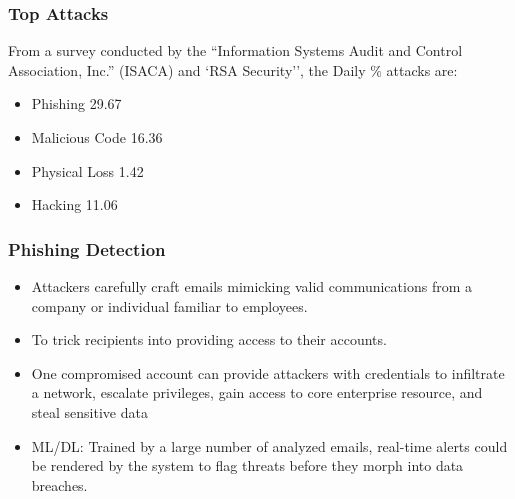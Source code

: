 \begin{frame}[fragile]\frametitle{Top Attacks}
From a survey conducted by the ``Information 
Systems Audit and Control Association, Inc.'' (ISACA) 
and `RSA Security'', the Daily \% attacks are:
	
	
		\begin{itemize}
		\item Phishing 29.67
		\item Malicious Code 16.36
		\item Physical Loss 1.42
		\item Hacking 11.06
		\end{itemize}


\end{frame}




\begin{frame}[fragile]\frametitle{Phishing Detection}
\begin{itemize}
\item  Attackers carefully craft emails mimicking 
valid communications from a company or individual familiar to employees.
\item  To trick recipients into providing access to their accounts.
\item One compromised account can provide attackers with credentials to
infiltrate a network, escalate privileges, gain access to core enterprise resource,
and steal sensitive data
\item ML/DL: Trained by a large number of analyzed emails, real-time alerts could be rendered
by the system to flag threats before they morph into data breaches.
\end{itemize}


\end{frame}

